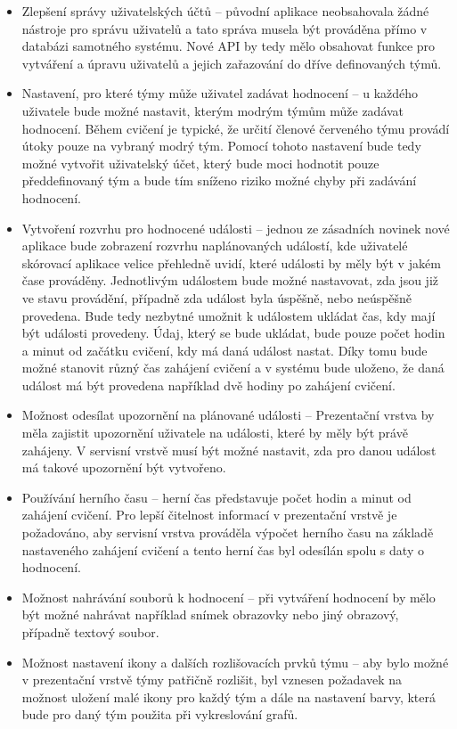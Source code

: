\documentclass[
  digital, %
  twoside, %
  table,   %
  nolof,     %
  nolot,     %
]{fithesis3}
\begin{document}
\begin{itemize}
\item Zlepšení správy uživatelských účtů -- původní aplikace neobsahovala žádné nástroje pro správu uživatelů a tato správa musela být prováděna přímo v databázi samotného systému. Nové API by tedy mělo obsahovat funkce pro vytváření a úpravu uživatelů a jejich zařazování do dříve definovaných týmů.
\item Nastavení, pro které týmy může uživatel zadávat hodnocení -- u každého uživatele bude možné nastavit, kterým modrým týmům může zadávat hodnocení. Během cvičení je typické, že určití členové červeného týmu provádí útoky pouze na vybraný modrý tým. Pomocí tohoto nastavení bude tedy možné vytvořit uživatelský účet, který bude moci hodnotit pouze předdefinovaný tým a bude tím sníženo riziko možné chyby při zadávání hodnocení.
\item Vytvoření rozvrhu pro hodnocené události -- jednou ze zásadních novinek nové aplikace bude zobrazení rozvrhu naplánovaných událostí, kde uživatelé skórovací aplikace velice přehledně uvidí, které události by měly být v jakém čase prováděny. Jednotlivým událostem bude možné nastavovat, zda jsou již ve stavu provádění, případně zda událost byla úspěšně, nebo neúspěšně provedena. Bude tedy nezbytné umožnit k událostem ukládat čas, kdy mají být události provedeny. Údaj, který se bude ukládat, bude pouze počet hodin a minut od začátku cvičení, kdy má daná událost nastat. Díky tomu bude možné stanovit různý čas zahájení cvičení a v systému bude uloženo, že daná událost má být provedena například dvě hodiny po zahájení cvičení.
\item Možnost odesílat upozornění na plánované události -- Prezentační vrstva by měla zajistit upozornění uživatele na události, které by měly být právě zahájeny. V servisní vrstvě musí být možné nastavit, zda pro danou událost má takové upozornění být vytvořeno.
\item Používání herního času -- herní čas představuje počet hodin a minut od zahájení cvičení. Pro lepší čitelnost informací v prezentační vrstvě je požadováno, aby servisní vrstva prováděla výpočet herního času na základě nastaveného zahájení cvičení a tento herní čas byl odesílán spolu s daty o hodnocení.
\item Možnost nahrávání souborů k hodnocení – při vytváření hodnocení by mělo být možné nahrávat například snímek obrazovky nebo jiný obrazový, případně textový soubor.
\item Možnost nastavení ikony a dalších rozlišovacích prvků týmu -- aby bylo možné v prezentační vrstvě týmy patřičně rozlišit, byl vznesen požadavek na možnost uložení malé ikony pro každý tým a dále na nastavení barvy, která bude pro daný tým použita při vykreslování grafů.
\end{itemize}
\end{document}

